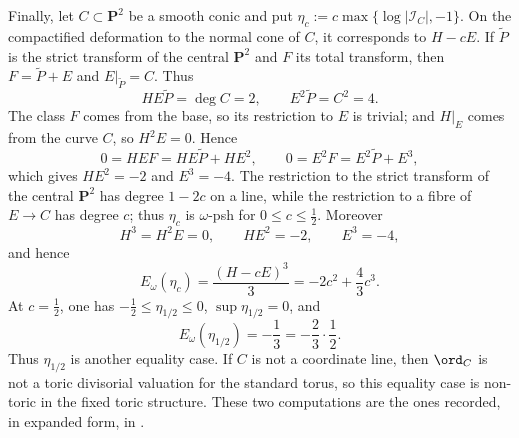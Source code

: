 \begin{remark}
Finally, let \(C\subset\mathbf P^2\) be a smooth conic and put
\(\eta_c:=c\max\{\log|\mathcal I_C|,-1\}\).  On the compactified
deformation to the normal cone of \(C\), it corresponds to \(H-cE\).  If
\(\widetilde P\) is the strict transform of the central \(\mathbf P^2\)
and \(F\) its total transform, then
\(F=\widetilde P+E\) and \(E|_{\widetilde P}=C\).  Thus
\[
 HE\widetilde P=\deg C=2,
 \qquad E^2\widetilde P=C^2=4.
\]
The class \(F\) comes from the base, so its restriction to \(E\) is
trivial; and \(H|_E\) comes from the curve \(C\), so \(H^2E=0\).  Hence
\[
 0=HEF=HE\widetilde P+HE^2,
 \qquad
 0=E^2F=E^2\widetilde P+E^3,
\]
which gives \(HE^2=-2\) and \(E^3=-4\).
The restriction to the strict transform of the central \(\mathbf P^2\)
has degree \(1-2c\) on a line, while the restriction to a fibre of
\(E\to C\) has degree \(c\); thus \(\eta_c\) is \(\omega\)-psh for
\(0\le c\le\tfrac12\).  Moreover
\[
 H^3=H^2E=0,\qquad HE^2=-2,\qquad E^3=-4,
\]
and hence
\[
 E_\omega(\eta_c)=\frac{(H-cE)^3}{3}
 =-2c^2+\frac43c^3.
\]
At \(c=\tfrac12\), one has
\(-\tfrac12\le\eta_{1/2}\le0\),
\(\sup\eta_{1/2}=0\), and
\[
 E_\omega(\eta_{1/2})=-\frac13
 =-\frac23\cdot\frac12.
\]
Thus \(\eta_{1/2}\) is another equality case.  If \(C\) is not a
coordinate line, then \(\ord_C\) is not a toric divisorial valuation for
the standard torus, so this equality case is non-toric in the fixed toric
structure.  These two computations are the ones recorded, in expanded
form, in .
\end{remark}
